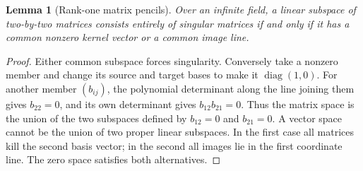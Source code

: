 \documentclass[11pt]{article}
\newtheorem{lemma}[theorem]{Lemma}
\theoremstyle{definition}\newtheorem{definition}[theorem]{Definition}
\theoremstyle{remark}\newtheorem{remark}[theorem]{Remark}
\begin{document}
\begin{lemma}[Rank-one matrix pencils]\label{lem:matrix-pencil}
Over an infinite field, a linear subspace of two-by-two matrices consists entirely of singular matrices if and only if it has a common nonzero kernel vector or a common image line.
\end{lemma}
\begin{proof}
Either common subspace forces singularity. Conversely take a nonzero member and change its source and target bases to make it $\operatorname{diag}(1,0)$. For another member $(b_{ij})$, the polynomial determinant along the line joining them gives $b_{22}=0$, and its own determinant gives $b_{12}b_{21}=0$. Thus the matrix space is the union of the two subspaces defined by $b_{12}=0$ and $b_{21}=0$. A vector space cannot be the union of two proper linear subspaces. In the first case all matrices kill the second basis vector; in the second all images lie in the first coordinate line. The zero space satisfies both alternatives.
\end{proof}
\end{document}
